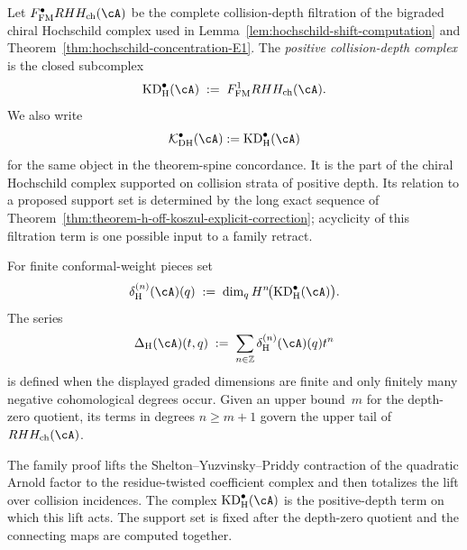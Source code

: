 \begin{definition}
\label{def:koszul-defect-complex}
Let $F^\bullet_{\mathrm{FM}}RHH_{\mathrm{ch}}(\cA)$ be the complete
collision-depth filtration of the bigraded chiral Hochschild complex
used in Lemma~\ref{lem:hochschild-shift-computation} and
Theorem~\ref{thm:hochschild-concentration-E1}. The
\emph{positive collision-depth complex} is the closed subcomplex
\[
 \mathrm{KD}_{\mathrm H}^{\bullet}(\cA)
 \;:=\;
 F^1_{\mathrm{FM}}RHH_{\mathrm{ch}}(\cA).
\]
We also write
\[
 \mathcal K_{\mathrm{DH}}^{\bullet}(\cA)
 := \mathrm{KD}_{\mathrm H}^{\bullet}(\cA)
\]
for the same object in the theorem-spine concordance.  It is the part
of the chiral Hochschild complex supported on collision strata of
positive depth.  Its relation to a proposed support set is determined
by the long exact sequence of
Theorem~\ref{thm:theorem-h-off-koszul-explicit-correction}; acyclicity
of this filtration term is one possible input to a family retract.
\end{definition}

\begin{definition}
\label{def:koszul-defect-measure}
For finite conformal-weight pieces set
\[
 \delta_{\mathrm H}^{(n)}(\cA)(q)
 \;:=\;
 \dim_q H^{n}\!\bigl(\mathrm{KD}_{\mathrm H}^{\bullet}(\cA)\bigr).
\]
The series
\[
 \Delta_{\mathrm H}(\cA)(t,q)
 \;:=\;
 \sum_{n\in\mathbb Z}\delta_{\mathrm H}^{(n)}(\cA)(q)t^n
\]
is defined when the displayed graded dimensions are finite and only
finitely many negative cohomological degrees occur.  Given an upper
bound~$m$ for the depth-zero quotient, its terms in degrees
$n\geq m+1$ govern the upper tail of $RHH_{\mathrm{ch}}(\cA)$.
\end{definition}

\begin{remark}
\label{rem:koszul-defect-measure-right}
The family proof lifts the Shelton--Yuzvinsky--Priddy contraction of
the quadratic Arnold factor to the residue-twisted coefficient
complex and then totalizes the lift over collision incidences.  The
complex $\mathrm{KD}_{\mathrm H}^{\bullet}(\cA)$ is the positive-depth
term on which this lift acts.  The support set is fixed after the
depth-zero quotient and the connecting maps are computed together.
\end{remark}

